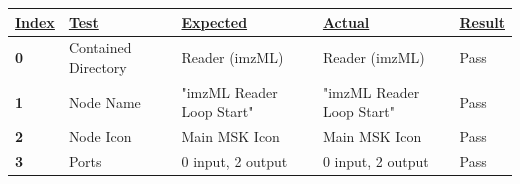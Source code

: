 \documentclass[11pt,openany]{book}
\begin{document}
\begin{table}
\begin{adjustbox}{width=1\textwidth}
\small
{  \renewcommand{\arraystretch}{1.4}
\begin{tabular}{|l|l|l|l|l|}
\hline
{\ul \textbf{Index}}                                       & {\ul \textbf{Test}}                                                                       & {\ul \textbf{Expected}}                                                                               & {\ul \textbf{Actual}}                                                                       & {\ul \textbf{Result}}                             \\ \hline
\textbf{0}                                                 & Contained Directory                                                                       & Reader (imzML)                                                                                        & Reader (imzML)                                                                              & Pass                                              \\ \hline
\textbf{1}                                                 & Node Name                                                                                 & "imzML Reader Loop Start"                                                                             & "imzML Reader Loop Start"                                                                   & Pass                                              \\ \hline
\textbf{2}                                                 & Node Icon                                                                                 & Main MSK Icon                                                                                         & Main MSK Icon                                                                               & Pass                                              \\ \hline
\textbf{3}                                                 & Ports                                                                                     & 0 input, 2 output                                                                                     & 0 input, 2 output                                                                           & Pass                                              \\ \hline

\end{tabular}}
\end{adjustbox}
\end{table}
\end{document}
